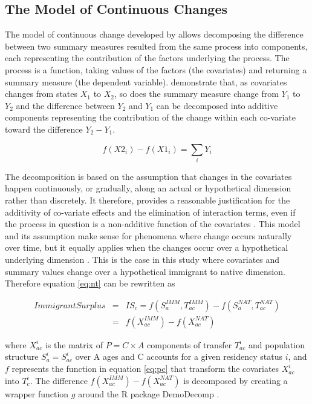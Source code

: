 \subsection{The Model of Continuous Changes}\label{sec:model}

The model of continuous change developed by \citet{Horiuchi:2008cn} allows decomposing the difference between two summary measures resulted from the same process into components, each representing the contribution of the factors underlying the process.
The process is a function, taking values of the factors (the covariates) and returning a summary measure (the dependent variable). \citet{Horiuchi:2008cn} demonstrate that, as covariates changes from states \( X_1 \) to \( X_2 \),  so does the summary measure change from \( Y_1 \) to \( Y_2 \)  and the difference between \( Y_2 \) and \( Y_1 \) can be decomposed into additive components representing the contribution of the change within each co-variate toward the difference \( Y_2 - Y_1\).

\begin{equation}\label{eq:ho}
  f(X2_{i}) - f(X1_{i}) = \displaystyle\sum_{i}Y_{i}
\end{equation}

The decomposition is based on the assumption that changes in the covariates happen continuously, or gradually, along an actual or hypothetical dimension rather than discretely.
It therefore, provides a reasonable justification for the additivity of co-variate effects and the elimination of interaction terms, even if the process in question is a non-additive function of the covariates \citep[p.~786]{Horiuchi:2008cn}.
This model and its assumption make sense for phenomena where change occurs naturally over time, but it equally applies when the changes occur over a hypothetical underlying dimension \citep[p.~790]{Horiuchi:2008cn}.
This is the case in this study where covariates and summary values change over a hypothetical immigrant to native dimension.
Therefore equation \eqref{eq:nt} can be rewritten as

\begin{eqnarray}
  Immigrant Surplus &=&IS_{c}=f(S^{IMM}_a, T^{IMM}_{ac})-f(S^{NAT}_a, T^{NAT}_{ac}) \nonumber \\
&=& f(X^{IMM}_{ac})-f(X^{NAT}_{ac}) \label{eq:dc}
\end{eqnarray}

\vspace{0.7em}\par
where \( X^{i}_{ac}\) is the matrix of \( P=C \times A  \) components of transfer \( T^{i}_{ac} \) and population structure \( S^{i}_{a}=S^{i}_{ac} \) over A ages and C accounts for a given residency status \( i \), and \( f \) represents the function in equation \eqref{eq:pc} that transform the covariates \( X^{i}_{ac}\) into \(T^{i}_c\).
The difference \( f(X^{IMM}_{ac}) - f(X^{NAT}_{ac}) \) is decomposed by creating a wrapper function \(g\) around the R package DemoDecomp \citep{DemoDecomp:2018,Rstat:2018}.

